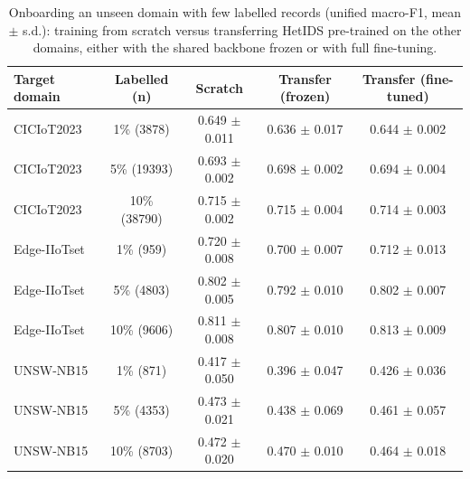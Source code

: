 \begin{table}[htbp]\centering\scriptsize
\caption{Onboarding an unseen domain with few labelled records (unified macro-F1, mean $\pm$ s.d.): training from scratch versus transferring HetIDS pre-trained on the other domains, either with the shared backbone frozen or with full fine-tuning.}
\label{tab:fewshot}
\begin{tabular}{lcccc}
\toprule
Target domain & Labelled (n) & Scratch & Transfer (frozen) & Transfer (fine-tuned) \\
\midrule
CICIoT2023 & 1\% (3878) & 0.649 $\pm$ 0.011 & 0.636 $\pm$ 0.017 & 0.644 $\pm$ 0.002 \\
CICIoT2023 & 5\% (19393) & 0.693 $\pm$ 0.002 & 0.698 $\pm$ 0.002 & 0.694 $\pm$ 0.004 \\
CICIoT2023 & 10\% (38790) & 0.715 $\pm$ 0.002 & 0.715 $\pm$ 0.004 & 0.714 $\pm$ 0.003 \\
Edge-IIoTset & 1\% (959) & 0.720 $\pm$ 0.008 & 0.700 $\pm$ 0.007 & 0.712 $\pm$ 0.013 \\
Edge-IIoTset & 5\% (4803) & 0.802 $\pm$ 0.005 & 0.792 $\pm$ 0.010 & 0.802 $\pm$ 0.007 \\
Edge-IIoTset & 10\% (9606) & 0.811 $\pm$ 0.008 & 0.807 $\pm$ 0.010 & 0.813 $\pm$ 0.009 \\
UNSW-NB15 & 1\% (871) & 0.417 $\pm$ 0.050 & 0.396 $\pm$ 0.047 & 0.426 $\pm$ 0.036 \\
UNSW-NB15 & 5\% (4353) & 0.473 $\pm$ 0.021 & 0.438 $\pm$ 0.069 & 0.461 $\pm$ 0.057 \\
UNSW-NB15 & 10\% (8703) & 0.472 $\pm$ 0.020 & 0.470 $\pm$ 0.010 & 0.464 $\pm$ 0.018 \\
\bottomrule
\end{tabular}
\end{table}